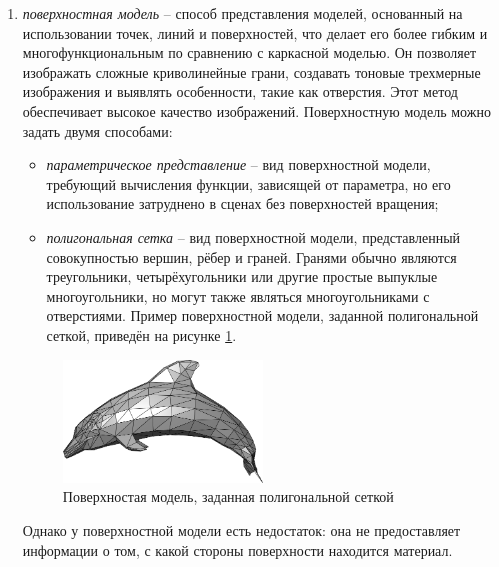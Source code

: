 \begin{enumerate}
	\item \textit{поверхностная модель} -- способ представления моделей, основанный на использовании точек, линий и поверхностей, что делает его более гибким и многофункциональным по сравнению с каркасной моделью. Он позволяет изображать сложные криволинейные грани, создавать тоновые трехмерные изображения и выявлять особенности, такие как отверстия. Этот метод обеспечивает высокое качество изображений. Поверхностную модель можно задать двумя способами:
	\begin{itemize}[label=--]
		\item \textit{параметрическое представление} -- вид поверхностной модели, требующий вычисления функции, зависящей от параметра, но его использование затруднено в сценах без поверхностей вращения;
		\item \textit{полигональная сетка} -- вид поверхностной модели, представленный совокупностью вершин, рёбер и граней. Гранями обычно являются треугольники, четырёхугольники или другие простые выпуклые многоугольники, но могут также являться многоугольниками с отверстиями. Пример поверхностной модели, заданной полигональной сеткой, приведён на рисунке \ref{fig:polygonal-models}.
	\end{itemize}
	\begin{figure}[h] 
		\centering
		\includegraphics[width=0.5\textwidth]{images/polygonal-models.png}
		\caption{Поверхностая модель, заданная полигональной сеткой} 
		\label{fig:polygonal-models} 
	\end{figure}
	Однако у поверхностной модели есть недостаток: она не предоставляет информации о том, с какой стороны поверхности находится материал.
	

\end{enumerate}
